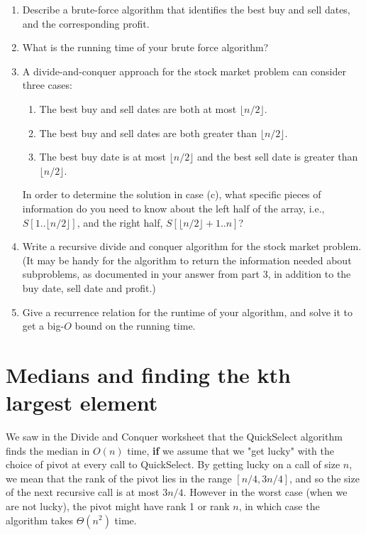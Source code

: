 \documentclass[11pt]{article}
\def\question#1{\red{#1}}
\def\red#1{{\color{red}#1}}
\begin{document}
\begin{enumerate}
\item \question{Describe a brute-force algorithm that identifies the best buy and sell dates, and the corresponding profit.}

\item \question{What is the running time of your brute force algorithm?}

\item A divide-and-conquer approach for the stock market problem can consider three cases:

\begin{enumerate}
\item The best buy and sell dates are both at most $\lfloor n/2 \rfloor$.
\item The best buy and sell dates are both greater than $\lfloor n/2 \rfloor$.
\item The best buy date is at most $\lfloor n/2 \rfloor$ and the best sell date
      is greater than $\lfloor n/2 \rfloor$.
\end{enumerate}

In order to determine the solution in case (c), \question{what specific pieces of information do you need to know about the left half of the array, i.e., $S[1..\lfloor n/2 \rfloor]$, and the right half, $S[\lfloor n/2 \rfloor+1.. n]$?}

\item \question{Write a recursive divide and conquer algorithm for the stock market problem.} (It may be handy for the algorithm to return
the information needed about subproblems, as documented in
your answer from part 3, in addition to the buy date, sell date and profit.)

\item \question{Give a recurrence relation for the runtime of your algorithm, and solve it to get a big-$O$ bound on the running time.}
\end{enumerate}
\section{Medians and finding the kth largest element}
\label{sec-2}
We saw in the Divide and Conquer worksheet that the QuickSelect
algorithm finds the median in $O(n)$ time, \textbf{if} we assume that we "get
lucky" with the choice of pivot at every call to QuickSelect. By getting
lucky on a call of size $n$, we mean that the rank of the pivot lies
in the range $[n/4,3n/4]$, and so the size of the next recursive call is at
most $3n/4$.  However in the worst case (when we are not lucky),
the pivot might have rank 1 or rank $n$, in which
case the algorithm takes $\Theta(n^2)$ time.
\end{document}

